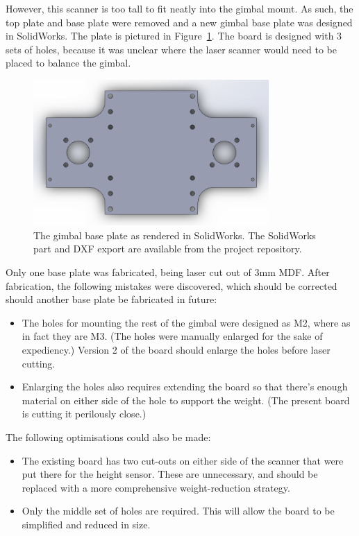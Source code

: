 \documentclass[12pt,oneside,a4paper]{book}
\begin{document}
However, this scanner is too tall to fit neatly into the gimbal
mount. As such, the top plate and base plate were removed and a new
gimbal base plate was designed in SolidWorks. The plate is pictured in
Figure~\ref{fig:baseplate}. The board is designed with 3 sets of
holes, because it was unclear where the laser scanner would need to be
placed to balance the gimbal.

\begin{figure}[h]
  \centering
  \includegraphics[width=0.8\textwidth]{figs/baseplate}
  \caption{The gimbal base plate as rendered in SolidWorks. The SolidWorks part and DXF export are available from the project repository.}
  \label{fig:baseplate}
\end{figure}

Only one base plate was fabricated, being laser cut out of 3mm
MDF. After fabrication, the following mistakes were discovered, which
should be corrected should another base plate be fabricated in future:
\begin{itemize}
\item The holes for mounting the rest of the gimbal were designed as
  M2, where as in fact they are M3. (The holes were manually enlarged
  for the sake of expediency.) Version 2 of the board should enlarge
  the holes before laser cutting.
\item Enlarging the holes also requires extending the board so that
  there's enough material on either side of the hole to support the
  weight. (The present board is cutting it perilously close.)
\end{itemize}

The following optimisations could also be made:
\begin{itemize}
\item The existing board has two cut-outs on either side of the
  scanner that were put there for the height sensor. These are
  unnecessary, and should be replaced with a more comprehensive
  weight-reduction strategy.
\item Only the middle set of holes are required. This will allow the
  board to be simplified and reduced in size.
\end{itemize}
\end{document}
